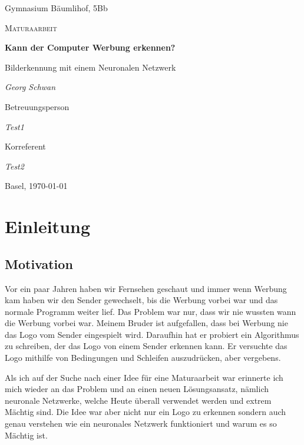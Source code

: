 \documentclass[12pt,a4paper]{report}
\begin{document}
\begin{titlepage}
	\centering
	{\Large Gymnasium Bäumlihof, 5Bb \par}
	\vspace{1cm}
	{\LARGE\scshape Maturaarbeit\par}
	\vspace{1.5cm}
	{\huge\bfseries Kann der Computer Werbung erkennen?\par}
	\vspace{0.6cm}
    {\Large Bilderkennung mit einem Neuronalen Netzwerk\par}
	\vspace{2cm}
	{\Large\itshape Georg Schwan\par}
	\vfill
	Betreuungsperson\par
	{\itshape Test1\par}
	Korreferent\par
	{\itshape Test2}
	\vfill
	{\large Basel, \today\par}
\end{titlepage}

\tableofcontents

\newpage

\chapter{Einleitung}\label{ch:einleitung}

\section{Motivation}
\label{sec:motivation}
Vor ein paar Jahren haben wir Fernsehen geschaut und immer wenn Werbung kam haben wir den Sender gewechselt,
bis die Werbung vorbei war und das normale Programm weiter lief.
Das Problem war nur, dass wir nie wussten wann die Werbung vorbei war.
Meinem Bruder ist aufgefallen, dass bei Werbung nie das Logo vom Sender eingespielt wird.
Daraufhin hat er probiert ein Algorithmus zu schreiben, der das Logo von einem Sender erkennen kann.
Er versuchte das Logo mithilfe von Bedingungen und Schleifen auszudrücken, aber vergebens.

Als ich auf der Suche nach einer Idee für eine Maturaarbeit war erinnerte ich mich wieder an das Problem und an einen neuen Lösungsansatz,
nämlich neuronale Netzwerke, welche Heute überall verwendet werden und extrem Mächtig sind.
Die Idee war aber nicht nur ein Logo zu erkennen sondern auch genau verstehen wie ein neuronales Netzwerk funktioniert und warum es so Mächtig ist.
\end{document}
